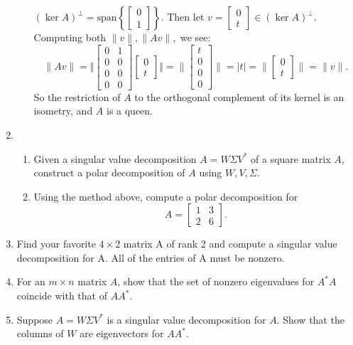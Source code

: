 \documentclass{article}
\begin{document}
\begin{enumerate}
\begin{enumerate}[label= (\alph*)]
    $\left( \ker A \right) ^{\perp}=\text{span}\left\{ \begin{bmatrix} 0\\1 \end{bmatrix}  \right\}  $. Then let $v=\begin{bmatrix} 0\\t \end{bmatrix} \in (\ker A)^{\perp}$. Computing both $\|v\|,\|Av\|,$ we see:
    \[
    \|Av\|=\Vert \begin{bmatrix} 0&1\\0&0\\ 0&0\\0&0  \end{bmatrix} \begin{bmatrix} 0\\t \end{bmatrix} \Vert=\|\begin{bmatrix} t\\0\\0\\0  \end{bmatrix} \|=|t|=\|\begin{bmatrix} 0\\t \end{bmatrix} \|=\|v\|
    .\] 
    So the restriction of $A$ to the orthogonal complement of its kernel is an isometry, and $A$ is a queen.
\end{enumerate}
\item \begin{enumerate}[label= (\alph*)] 
\item Given a singular value decomposition $A = W \Sigma V^* $ of a square matrix $A$, construct a polar decomposition of $A$ using $W,V,\Sigma$.

\item Using the method above, compute a polar decomposition for
\[
    A=\begin{bmatrix} 1&3\\2&6 \end{bmatrix} 
.\] 
\end{enumerate}

\item Find your favorite $4 \times  2$ matrix A of rank 2 and compute a singular value decomposition for A. All of the entries of A must be nonzero.

\item For an $m \times  n$ matrix $A$, show that the set of nonzero eigenvalues for $A^*  A$ coincide with that of $AA^* $.

\item Suppose $A = W \Sigma V^* $ is a singular value decomposition for $A$. Show that the columns of $W$ are eigenvectors for $AA^* $.

\end{enumerate}
\end{document}
